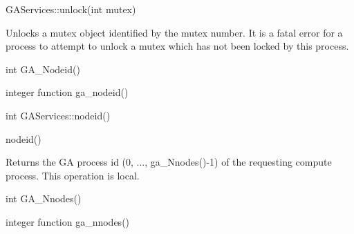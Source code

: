 \documentclass[12pt]{article}
\begin{document}
\begin{cxxapi}
\begin{cxxcode}
GAServices::unlock(int mutex)
\end{cxxcode}
\begin{funcargs}
\end{funcargs}
\end{cxxapi}

\begin{desc}

Unlocks a mutex object identified by the mutex number. It is a fatal 
error for a process to attempt to unlock a mutex which has not been 
locked by this process.
\end{desc}


\begin{capi}
\begin{ccode}
int GA_Nodeid()
\end{ccode}
\end{capi}

\begin{fapi}
\begin{fcode}
integer function ga_nodeid()
\end{fcode}
\end{fapi}

\begin{cxxapi}
\begin{cxxcode}
int GAServices::nodeid()
\end{cxxcode}
\end{cxxapi}

\begin{pyapi}
\begin{pycode}
nodeid() 
\end{pycode}
\end{pyapi} 


\begin{desc}

Returns the GA process id (0, ..., ga_Nnodes()-1) of the requesting compute process.
This operation is local.
\end{desc}


\begin{capi}
\begin{ccode}
int GA_Nnodes()
\end{ccode}
\end{capi}

\begin{fapi}
\begin{fcode}
integer function ga_nnodes()
\end{fcode}
\end{fapi}
\end{document}
